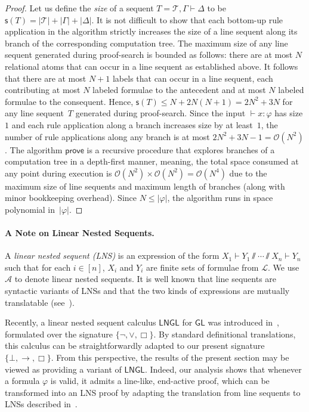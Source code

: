 \documentclass[copyright,creativecommons]{eptcs}
\newcommand{\logicgl}{\mathsf{GL}}
\newcommand{\tel}{\mathcal{T}}
\newcommand{\lnsg}{\mathcal{A}}
\renewcommand{\phi}{\varphi}
\newcommand{\imp}{\rightarrow}
\newcommand{\size}[1]{\mathsf{s}(#1)}
\newcommand{\lang}{\mathscr{L}}
\newcommand{\sar}{\vdash}
\newcommand{\tseq}{T} %
\newcommand{\set}[1]{\{#1\}}
\begin{document}
\begin{proof}
Let us define the \emph{size} of a sequent $\tseq = \tel, \Gamma \sar \Delta$ to be $\size{\tseq} = |\tel| + |\Gamma| + |\Delta|$. It is not difficult to show that each bottom-up rule application in the algorithm strictly increases the size of a line sequent along its branch of the corresponding computation tree. The maximum size of any line sequent generated during proof-search is bounded as follows: there are at most $N$ relational atoms that can occur in a line sequent as established above. It follows that there are at most $N{+}1$ labels that can occur in a line sequent, each contributing at most $N$ labeled formulae to the antecedent and at most $N$ labeled formulae to the consequent. Hence, $\size{\tseq} \leq N + 2N(N{+}1) = 2N^2 + 3N$ for any line sequent~$T$ generated during proof-search.  Since the input $\vdash x : \phi$ has size $1$ and each rule application along a branch increases size by at least~$1$, the number of rule applications along any branch is at most $2N^2 + 3N - 1 = \mathcal{O}(N^2)$. The algorithm $\mathsf{prove}$ is a recursive procedure that explores branches of a computation tree in a depth-first manner, meaning, the total space consumed at any point during execution is $\mathcal{O}(N^2) \times \mathcal{O}(N^2) = \mathcal{O}(N^4)$ due to the maximum size of line sequents and maximum length of branches (along with minor bookkeeping overhead). Since $N \leq |\phi|$, the algorithm runs in space polynomial in~$|\phi|$.
\end{proof}

\paragraph{A Note on Linear Nested Sequents.} A \emph{linear nested sequent (LNS)} is an expression of the form $X_{1} \sar Y_{1} \sslash \cdots \sslash X_{n} \sar Y_{n}$ such that for each $i \in [n]$, $X_i$ and $Y_i$ are finite sets of formulae from $\lang$. We use $\lnsg$ to denote linear nested sequents. It is well known that line sequents are syntactic variants of LNSs and that the two kinds of expressions are mutually translatable (see~\cite{LelPim15}).

Recently, a linear nested sequent calculus $\mathsf{LNGL}$ for $\logicgl$ was introduced in~\cite{Lyo25}, formulated over the signature $\set{\neg,\lor,\Box}$. By standard definitional translations, this calculus can be straightforwardly adapted to our present signature $\set{\bot,\imp,\Box}$. %
From this perspective, the results of the present section may be viewed as providing a variant of $\mathsf{LNGL}$. Indeed, our analysis shows that whenever a formula $\phi$ is valid, it admits a line-like, end-active proof, which can be transformed into an LNS proof by adapting the translation from line sequents to LNSs described in~\cite{LelPim15}.
\end{document}
